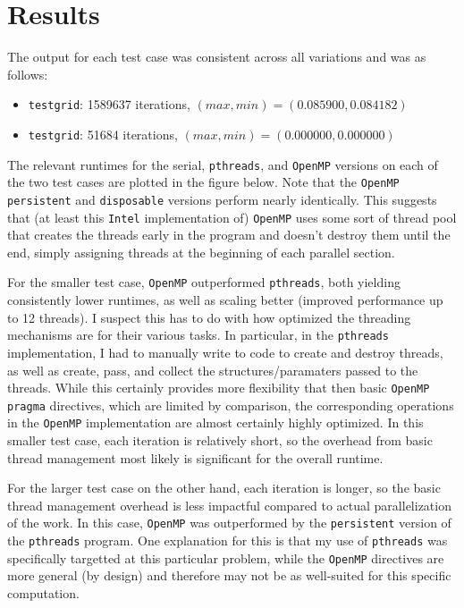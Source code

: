 \documentclass{article}
\begin{document}
\newpage
\section*{Results}
\label{sec:results}

The output for each test case was consistent across all variations and was as follows:
\begin{itemize}
    \item \texttt{testgrid}: 1589637 iterations, $(max, min) = (0.085900, 0.084182)$
    \item \texttt{testgrid}: 51684 iterations, $(max, min) = (0.000000, 0.000000)$
\end{itemize}

The relevant runtimes for the serial, \texttt{pthreads}, and \texttt{OpenMP}
versions on each of the two test cases are plotted in the figure below. Note
that the \texttt{OpenMP} \texttt{persistent} and \texttt{disposable} versions
perform nearly identically. This suggests that (at least this \texttt{Intel}
implementation of) \texttt{OpenMP} uses some sort of thread pool that creates
the threads early in the program and doesn't destroy them until the end, simply
assigning threads at the beginning of each parallel section.

For the smaller test case, \texttt{OpenMP} outperformed \texttt{pthreads}, both
yielding consistently lower runtimes, as well as scaling better (improved performance
up to 12 threads). I suspect this has to do with how optimized the threading
mechanisms are for their various tasks. In particular, in the \texttt{pthreads}
implementation, I had to manually write to code to create and destroy threads,
as well as create, pass, and collect the structures/paramaters passed to the
threads. While this certainly provides more flexibility that then basic
\texttt{OpenMP} \texttt{pragma} directives, which are limited by comparison,
the corresponding operations in the \texttt{OpenMP} implementation are almost
certainly highly optimized. In this smaller test case, each iteration is
relatively short, so the overhead from basic thread management most likely is
significant for the overall runtime.

For the larger test case on the other hand, each iteration is longer, so the
basic thread management overhead is less impactful compared to actual
parallelization of the work.  In this case, \texttt{OpenMP} was outperformed by
the \texttt{persistent} version of the \texttt{pthreads} program. One
explanation for this is that my use of \texttt{pthreads} was specifically
targetted at this particular problem, while the \texttt{OpenMP} directives are
more general (by design) and therefore may not be as well-suited for this
specific computation.
\end{document}

